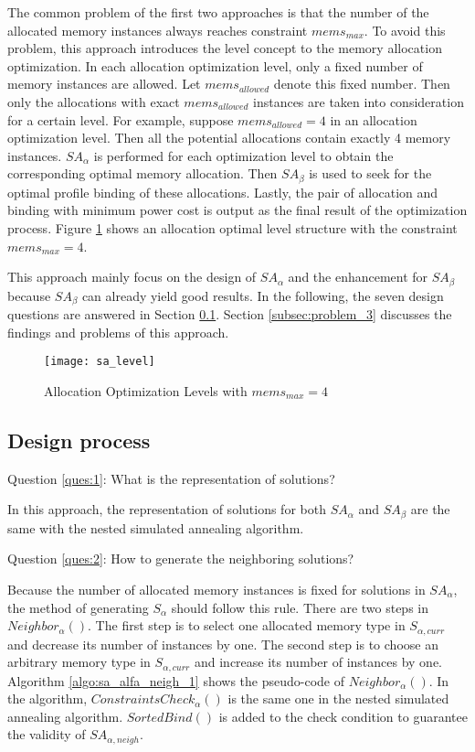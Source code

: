 	The common problem of the first two approaches
	is that the number of the allocated memory instances always reaches constraint
	$mems_{max}$.
	To avoid this problem, this approach introduces the level concept to the memory
	allocation optimization. In each allocation optimization level, only a fixed
	number of memory instances are allowed. Let $mems_{allowed}$ denote this fixed
	number. Then only the allocations with exact $mems_{allowed}$ instances are
	taken into consideration for a certain level.
	For example, suppose $mems_{allowed}=4$ in an allocation optimization level.
	Then all the potential allocations contain exactly 4 memory instances.
	$SA_{\alpha}$ is performed for each optimization level to obtain the corresponding
	optimal memory allocation. Then $SA_{\beta}$ is used to seek for the optimal
	profile binding of these allocations. Lastly, the pair of allocation and binding
	with minimum power cost is output as the final result of the optimization process.
	Figure \ref{fig:sa_level} shows an allocation optimal level structure with the
	constraint $mems_{max}=4$.
	
	This approach mainly focus on the design of $SA_{\alpha}$ and the enhancement
	for $SA_{\beta}$ because $SA_{\beta}$ can already yield good results.
	In the following, the seven design questions are answered in Section
	\ref{subsec:design_3}. Section \ref{subsec:problem_3} discusses the findings
	and problems of this approach.
	\begin{figure}[h]
		\begin{center}
			\texttt{[image: sa\_level]}
			\caption{Allocation Optimization Levels with $mems_{max}=4$}
			\label{fig:sa_level}
		\end{center}
	\end{figure}

		\subsection{Design process}
		\label{subsec:design_3}
		Question \ref{ques:1}: What is the representation of solutions?
		
		In this approach, the representation of solutions for both $SA_{\alpha}$
		and $SA_{\beta}$ are the same with the nested simulated annealing algorithm.
		
		Question \ref{ques:2}: How to generate the neighboring solutions?
		
		Because the number of allocated memory instances is fixed for solutions in
		$SA_{\alpha}$, the method of generating $S_{\alpha}$ should follow this rule.
		There are two steps in $Neighbor_{\alpha}()$.
		The first step is to select one allocated memory type in $S_{\alpha,curr}$
		and decrease its number of instances by one.
		The second step is to choose an arbitrary memory type in $S_{\alpha,curr}$
		and increase its number of instances by one.
		Algorithm \ref{algo:sa_alfa_neigh_1} shows the pseudo-code of
		$Neighbor_{\alpha}()$.
		In the algorithm, $ConstraintsCheck_{\alpha}()$ is the same one in the nested
		simulated annealing algorithm. $SortedBind()$ is added to the check condition
		to guarantee the validity of $SA_{\alpha,neigh}$.
		
		

